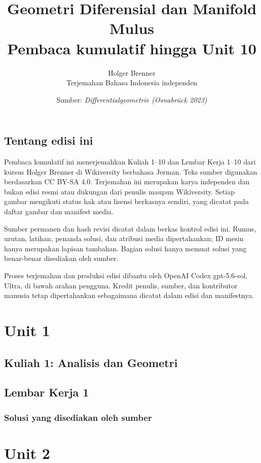 \documentclass[11pt,a4paper,oneside]{book}
\title{Geometri Diferensial dan Manifold Mulus\\\large Pembaca kumulatif hingga Unit 10}
\author{Holger Brenner\\Terjemahan Bahasa Indonesia independen}
\date{Sumber: \textit{Differentialgeometrie (Osnabrück 2023)}}
\begin{document}
\hypersetup{pageanchor=false}
\maketitle
\hypersetup{pageanchor=true}
\frontmatter
\chapter*{Tentang edisi ini}
Pembaca kumulatif ini menerjemahkan Kuliah 1--10 dan Lembar Kerja 1--10 dari kursus Holger Brenner di Wikiversity berbahasa Jerman. Teks sumber digunakan berdasarkan CC BY-SA 4.0. Terjemahan ini merupakan karya independen dan bukan edisi resmi atau dukungan dari penulis maupun Wikiversity. Setiap gambar mengikuti status hak atau lisensi berkasnya sendiri, yang dicatat pada daftar gambar dan manifest media.

Sumber permanen dan hash revisi dicatat dalam berkas kontrol edisi ini. Rumus, urutan, latihan, penanda solusi, dan atribusi media dipertahankan; ID mesin hanya merupakan lapisan tambahan. Bagian solusi hanya memuat solusi yang benar-benar disediakan oleh sumber.

Proses terjemahan dan produksi edisi dibantu oleh OpenAI Codex gpt-5.6-sol, Ultra, di bawah arahan pengguna. Kredit penulis, sumber, dan kontributor manusia tetap dipertahankan sebagaimana dicatat dalam edisi dan manifestnya.
\tableofcontents

\mainmatter
\part{Unit 1}
\chapter[Kuliah 1]{Kuliah 1: Analisis dan Geometri}


\chapter{Lembar Kerja 1}


\section*{Solusi yang disediakan oleh sumber}


\part{Unit 2}
\end{document}
